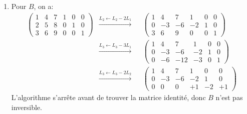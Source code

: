 {\begin{td-sol}[]
\begin{enumerate}
			\item Pour \(B\), on a:
			\begin{equation*}
				\begin{aligned}
					\left(\begin{array}{ccc|ccc} %
						1 & 4 & 7 & 1 & 0 & 0\\
						2 & 5 & 8 & 0 & 1 & 0\\
						3 & 6 & 9 & 0 & 0 & 1
					\end{array}\right)
					&\xrightarrow{L_2 \leftarrow L_2 - 2L_1}&&
					\left(\begin{array}{ccc|ccc} %
						1 & 4 & 7 & 1 & 0 & 0\\
						0 & -3 & -6 & -2 & 1 & 0\\
						3 & 6 & 9 & 0 & 0 & 1
					\end{array}\right)\\
					&\xrightarrow{L_3 \leftarrow L_3 - 3L_1}&&
					\left(\begin{array}{ccc|ccc} %
						1 & 4 & 7 & 1 & 0 & 0\\
						0 & -3 & -6 & -2 & 1 & 0\\
						0 & -6 & -12 & -3 & 0 & 1
					\end{array}\right)\\
					&\xrightarrow{L_3 \leftarrow L_3 - 2L_2}&&
					\left(\begin{array}{ccc|ccc} %
						1 & 4 & 7 & 1 & 0 & 0\\
						0 & -3 & -6 & -2 & 1 & 0\\
						0 & 0 & 0 & +1 & -2 & +1
					\end{array}\right)
				\end{aligned}
			\end{equation*}
			L'algorithme s'arrête avant de trouver la matrice identité, donc \(B\) n'est pas inversible.
		\end{enumerate}
	\end{td-sol}
}{}


